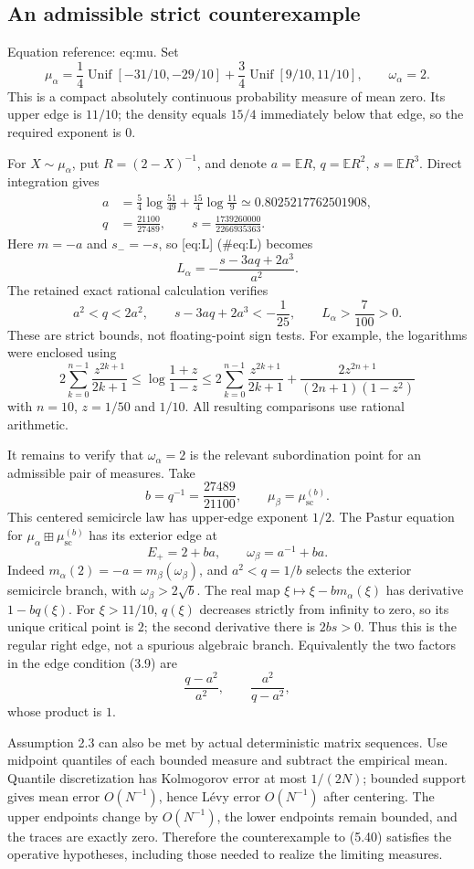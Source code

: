 \documentclass[10pt]{article}
\begin{document}
\subsection*{An admissible strict counterexample}
Equation reference: eq:mu. Set \[
 \mu_\alpha=\frac14\operatorname{Unif}[-31/10,-29/10]
             +\frac34\operatorname{Unif}[9/10,11/10],
 \qquad \omega_\alpha=2 .\] This is a compact absolutely continuous probability measure of mean zero. Its upper edge is \(11/10\); the density equals \(15/4\) immediately below that edge, so the required exponent is \(0\).\par
For \(X\sim\mu_\alpha\), put \(R=(2-X)^{-1}\), and denote \(a=\mathbb ER\), \(q=\mathbb ER^2\), \(s=\mathbb ER^3\). Direct integration gives \[\begin{split}
 a&=\frac54\log\frac{51}{49}+\frac{15}{4}\log\frac{11}{9}
       \simeq0.8025217762501908,\\
 q&=\frac{21100}{27489},\qquad
 s=\frac{1739260000}{2266935363}.
 \end{split}\] Here \(m=-a\) and \(s_-=-s\), so [eq:L] (\#eq:L) becomes \[L_\alpha=-\frac{s-3aq+2a^3}{a^2}.\] The retained exact rational calculation verifies \[a^2<q<2a^2,\qquad
 s-3aq+2a^3<-\frac1{25},\qquad
 L_\alpha>\frac7{100}>0 .\] These are strict bounds, not floating-point sign tests. For example, the logarithms were enclosed using \[2\sum_{k=0}^{n-1}\frac{z^{2k+1}}{2k+1}
 \le\log\frac{1+z}{1-z}
 \le2\sum_{k=0}^{n-1}\frac{z^{2k+1}}{2k+1}
       +\frac{2z^{2n+1}}{(2n+1)(1-z^2)}\] with \(n=10\), \(z=1/50\) and \(1/10\). All resulting comparisons use rational arithmetic.\par
It remains to verify that \(\omega_\alpha=2\) is the relevant subordination point for an admissible pair of measures. Take \[b=q^{-1}=\frac{27489}{21100},
 \qquad \mu_\beta=\mu_{\mathrm{sc}}^{(b)} .\] This centered semicircle law has upper-edge exponent \(1/2\). The Pastur equation for \(\mu_\alpha\boxplus\mu_{\mathrm{sc}}^{(b)}\) has its exterior edge at \[E_+=2+ba,\qquad \omega_\beta=a^{-1}+ba .\] Indeed \(m_\alpha(2)=-a=m_\beta(\omega_\beta)\), and \(a^2<q=1/b\) selects the exterior semicircle branch, with \(\omega_\beta>2\sqrt b\). The real map \(\xi\mapsto\xi-bm_\alpha(\xi)\) has derivative \(1-bq(\xi)\). For \(\xi>11/10\), \(q(\xi)\) decreases strictly from infinity to zero, so its unique critical point is \(2\); the second derivative there is \(2bs>0\). Thus this is the regular right edge, not a spurious algebraic branch. Equivalently the two factors in the edge condition (3.9) are \[\frac{q-a^2}{a^2},\qquad \frac{a^2}{q-a^2},\] whose product is \(1\).\par
Assumption 2.3 can also be met by actual deterministic matrix sequences. Use midpoint quantiles of each bounded measure and subtract the empirical mean. Quantile discretization has Kolmogorov error at most \(1/(2N)\); bounded support gives mean error \(O(N^{-1})\), hence Lévy error \(O(N^{-1})\) after centering. The upper endpoints change by \(O(N^{-1})\), the lower endpoints remain bounded, and the traces are exactly zero. Therefore the counterexample to (5.40) satisfies the operative hypotheses, including those needed to realize the limiting measures.\par
\end{document}
